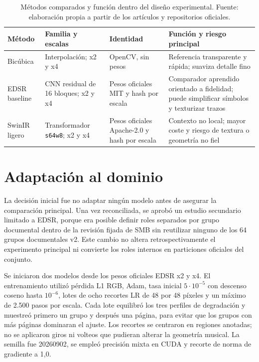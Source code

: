 \begin{table}[htbp]
  \centering
  \small
  \setlength{\tabcolsep}{3pt}
  \caption{Métodos comparados y función dentro del diseño experimental. Fuente: elaboración propia
  a partir de los artículos y repositorios oficiales.}
  \label{tab:method-selection}
  \begin{tabular}{p{}p{}p{}p{}}
    \toprule
    Método & Familia y escalas & Identidad & Función y riesgo principal \\
    \midrule
    Bicúbica & Interpolación; x2 y x4 & OpenCV, sin pesos & Referencia transparente y rápida; suaviza detalle fino \\
    EDSR baseline & CNN residual de 16 bloques; x2 y x4 & Pesos oficiales MIT y hash por escala & Comparador aprendido orientado a fidelidad; puede simplificar símbolos y texturizar trazos \\
    SwinIR ligero & Transformador \texttt{s64w8}; x2 y x4 & Pesos oficiales Apache-2.0 y hash por escala & Contexto no local; mayor coste y riesgo de textura o geometría no fiel \\
    \bottomrule
  \end{tabular}
\end{table}

\section{Adaptación al dominio}
La decisión inicial fue no adaptar ningún modelo antes de asegurar la comparación principal. Una
vez reconciliada, se aprobó un estudio secundario limitado a EDSR, porque era posible definir roles
separados por grupo documental dentro de la revisión fijada de SMB sin reutilizar ninguno de los 64 grupos documentales
v2. Este cambio no altera retrospectivamente el experimento principal ni convierte los roles
internos en particiones oficiales del conjunto.

Se iniciaron dos modelos desde los pesos oficiales EDSR x2 y x4. El entrenamiento utilizó pérdida
L1 RGB, Adam, tasa inicial \(5\cdot10^{-5}\) con descenso coseno hasta \(10^{-6}\), lotes de ocho
recortes LR de 48 por 48 píxeles y un máximo de 2.500 pasos por escala. Cada lote equilibró los tres
perfiles de degradación y muestreó primero un grupo y después una página, para evitar que los grupos
con más páginas dominaran el ajuste. Los recortes se centraron en regiones anotadas; no se aplicaron giros
ni volteos que pudieran alterar la geometría musical. La semilla fue 20260902, se empleó precisión
mixta en CUDA y recorte de norma de gradiente a 1,0.

